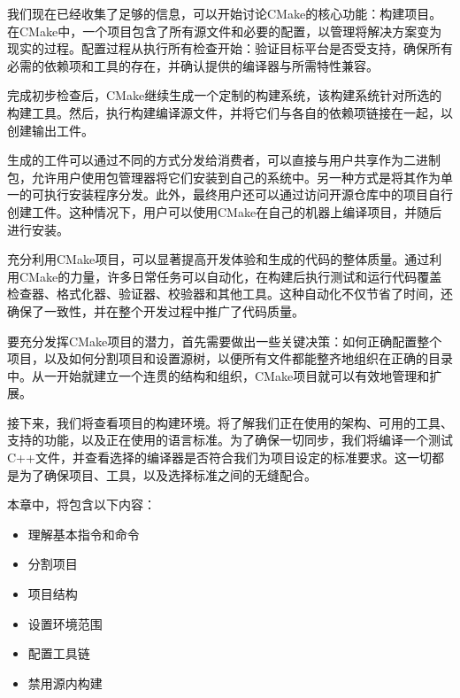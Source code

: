 我们现在已经收集了足够的信息，可以开始讨论CMake的核心功能：构建项目。在CMake中，一个项目包含了所有源文件和必要的配置，以管理将解决方案变为现实的过程。配置过程从执行所有检查开始：验证目标平台是否受支持，确保所有必需的依赖项和工具的存在，并确认提供的编译器与所需特性兼容。

完成初步检查后，CMake继续生成一个定制的构建系统，该构建系统针对所选的构建工具。然后，执行构建编译源文件，并将它们与各自的依赖项链接在一起，以创建输出工件。

生成的工件可以通过不同的方式分发给消费者，可以直接与用户共享作为二进制包，允许用户使用包管理器将它们安装到自己的系统中。另一种方式是将其作为单一的可执行安装程序分发。此外，最终用户还可以通过访问开源仓库中的项目自行创建工件。这种情况下，用户可以使用CMake在自己的机器上编译项目，并随后进行安装。

充分利用CMake项目，可以显著提高开发体验和生成的代码的整体质量。通过利用CMake的力量，许多日常任务可以自动化，在构建后执行测试和运行代码覆盖检查器、格式化器、验证器、校验器和其他工具。这种自动化不仅节省了时间，还确保了一致性，并在整个开发过程中推广了代码质量。

要充分发挥CMake项目的潜力，首先需要做出一些关键决策：如何正确配置整个项目，以及如何分割项目和设置源树，以便所有文件都能整齐地组织在正确的目录中。从一开始就建立一个连贯的结构和组织，CMake项目就可以有效地管理和扩展。

接下来，我们将查看项目的构建环境。将了解我们正在使用的架构、可用的工具、支持的功能，以及正在使用的语言标准。为了确保一切同步，我们将编译一个测试C++文件，并查看选择的编译器是否符合我们为项目设定的标准要求。这一切都是为了确保项目、工具，以及选择标准之间的无缝配合。

本章中，将包含以下内容：

\begin{itemize}
\item
理解基本指令和命令

\item
分割项目

\item
项目结构

\item
设置环境范围

\item
配置工具链

\item
禁用源内构建
\end{itemize}